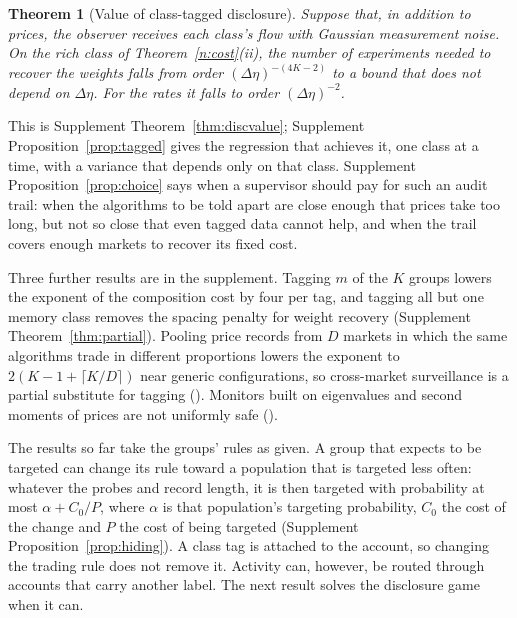 \documentclass[12pt]{article}
\newtheorem{theorem}{Theorem}[section]
\theoremstyle{definition}
\theoremstyle{remark}
\begin{document}
\begin{theorem}[Value of class-tagged disclosure]\label{n:disc}
Suppose that, in addition to prices, the observer receives each class's flow with Gaussian measurement noise. On the rich class of Theorem~\ref{n:cost}(ii), the number of experiments needed to recover the weights falls from order $(\Delta\eta)^{-(4K-2)}$ to a bound that does not depend on $\Delta\eta$. For the rates it falls to order $(\Delta\eta)^{-2}$.
\end{theorem}

This is Supplement Theorem~\ref{thm:discvalue}; Supplement Proposition~\ref{prop:tagged} gives the regression that achieves it, one class at a time, with a variance that depends only on that class. Supplement Proposition~\ref{prop:choice} says when a supervisor should pay for such an audit trail: when the algorithms to be told apart are close enough that prices take too long, but not so close that even tagged data cannot help, and when the trail covers enough markets to recover its fixed cost.

Three further results are in the supplement. Tagging $m$ of the $K$ groups lowers the exponent of the composition cost by four per tag, and tagging all but one memory class removes the spacing penalty for weight recovery (Supplement Theorem~\ref{thm:partial}). Pooling price records from $D$ markets in which the same algorithms trade in different proportions lowers the exponent to $2(K-1+\lceil K/D\rceil)$ near generic configurations, so cross-market surveillance is a partial substitute for tagging (\citealp[Theorem~S5.5]{niroula2026full}). Monitors built on eigenvalues and second moments of prices are not uniformly safe (\citealp[Theorem~S26.1]{niroula2026full}).

The results so far take the groups' rules as given. A group that expects to be targeted can change its rule toward a population that is targeted less often: whatever the probes and record length, it is then targeted with probability at most $\alpha+C_0/P$, where $\alpha$ is that population's targeting probability, $C_0$ the cost of the change and $P$ the cost of being targeted (Supplement Proposition~\ref{prop:hiding}). A class tag is attached to the account, so changing the trading rule does not remove it. Activity can, however, be routed through accounts that carry another label. The next result solves the disclosure game when it can.
\end{document}
